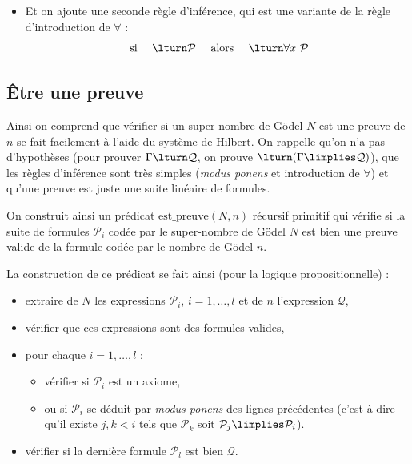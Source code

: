 \documentclass[11pt,class=report,crop=false]{standalone}
\begin{document}
\begin{itemize}
    \item Et on ajoute une seconde règle d'inférence, qui est une variante de la règle d'introduction de $\forall$ :
    \[
    \text{ si } \quad \lturn \mathcal{P} \quad \text{ alors } \quad \lturn \forall x \ \mathcal{P}
    \]
\end{itemize}


\subsection{Être une preuve}

Ainsi on comprend que vérifier si un super-nombre de Gödel $N$ est une preuve de $n$ se fait facilement à l'aide du système de Hilbert. 
On rappelle qu'on n'a pas d'hypothèses (pour prouver $\Gamma \lturn \mathcal{Q}$, on prouve $\lturn (\Gamma \limplies \mathcal{Q})$), que les règles d'inférence sont très simples (\emph{modus ponens} et introduction de $\forall$) et qu'une preuve est juste une suite linéaire de formules.

On construit ainsi un prédicat $\text{est\_preuve}(N, n)$ récursif primitif qui vérifie si la suite de formules $\mathcal{P}_i$ codée par le super-nombre de Gödel $N$ est bien une preuve valide de la formule codée par le nombre de Gödel $n$.


La construction de ce prédicat se fait ainsi (pour la logique propositionnelle) :
\begin{itemize}
    \item extraire de $N$ les expressions $\mathcal{P}_i$, $i=1,\ldots,l$ et de $n$ l'expression $\mathcal{Q}$,
    \item vérifier que ces expressions sont des formules valides,
    \item pour chaque $i=1,\ldots,l$ :
    \begin{itemize}
        \item vérifier si $\mathcal{P}_i$ est un axiome,
        \item ou si $\mathcal{P}_i$ se déduit par \emph{modus ponens} des lignes précédentes (c'est-à-dire qu'il existe $j, k < i$ tels que $\mathcal{P}_k$ soit $\mathcal{P}_j \limplies \mathcal{P}_i$).
    \end{itemize}
    \item vérifier si la dernière formule $\mathcal{P}_l$ est bien $\mathcal{Q}$.
\end{itemize}


\end{document}
